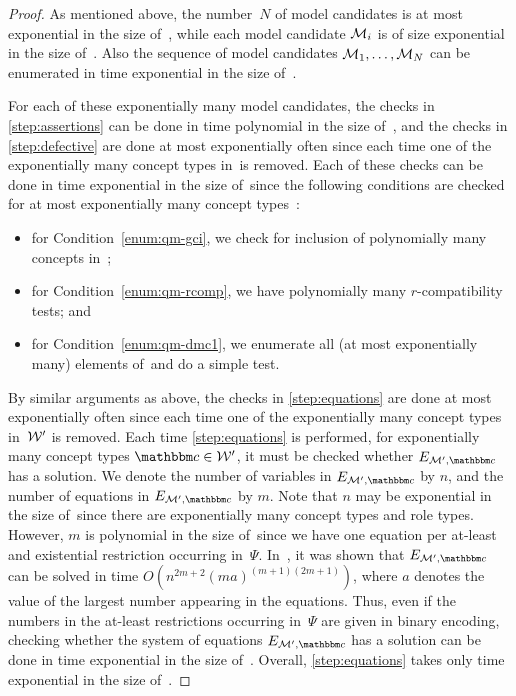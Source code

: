 \begin{proof}
    As mentioned above, the number~$N$ of model candidates is at most
    exponential in the size of~\Bmc, while each model candidate $\mathcal{M}_i$ is of
    size exponential in the size of~\Bmc.  Also the sequence of model candidates
    $\mathcal{M}_1,\dots,\mathcal{M}_N$ can be enumerated in time exponential in the size
    of~\Bmc.

    For each of these exponentially many model candidates, the checks in
    \ref{step:assertions} can be done in time polynomial in the size of~\Bmc,
    and the checks in \ref{step:defective} are done at most exponentially often
    since each time one of the exponentially many concept types in~\Wmc is
    removed.  Each of these checks can be done in time exponential in the size
    of~\Bmc since the following conditions are checked for at most exponentially
    many concept types~\cbb:
    \begin{itemize}
        \item for Condition~\ref{enum:qm-gci}, we check for inclusion of
            polynomially many concepts in~\cbb;
        \item for Condition~\ref{enum:qm-rcomp}, we have polynomially many
            $r$-compatibility tests; and
        \item for Condition~\ref{enum:qm-dmc1}, we enumerate all (at most
            exponentially many) elements of~\Ymc and do a simple test.
    \end{itemize}
    By similar arguments as above, the checks in \ref{step:equations} are done
    at most exponentially often since each time one of the exponentially many
    concept types in~$\mathcal{W}'$ is removed.  Each time \ref{step:equations} is
    performed, for exponentially many concept types $\cbb\in\Wmc'$, it must be
    checked whether $E_{\Mmc',\cbb}$ has a solution.  We denote the number of
    variables in $E_{\Mmc',\cbb}$ by $n$, and the number of equations in
    $E_{\Mmc',\cbb}$ by $m$.  Note that $n$ may be exponential in the size
    of~\Bmc since there are exponentially many concept types and role types.
    However, $m$ is polynomial in the size of~\Bmc since we have one equation
    per at-least and existential restriction occurring in~$\Psi$.
    In~\cite{Pap-JACM81}, it was shown that $E_{\Mmc',\cbb}$ can be solved in
    time $O(n^{2m+2}(ma)^{(m+1)(2m+1)})$, where $a$ denotes the value of the
    largest number appearing in the equations.  Thus, even if the numbers in
    the at-least restrictions occurring in~$\Psi$ are given in binary encoding,
    checking whether the system of equations $E_{\Mmc',\cbb}$ has a solution can
    be done in time exponential in the size of~\Bmc.  Overall,
    \ref{step:equations} takes only time exponential in the size of~\Bmc.


\end{proof}
